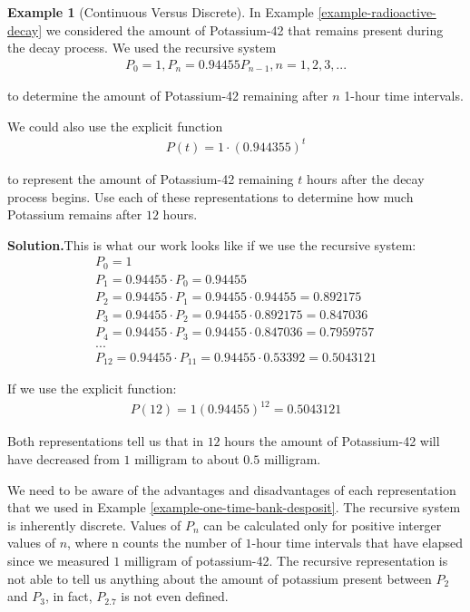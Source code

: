 \documentclass[10pt,]{book}
\theoremstyle{plain}
\theoremstyle{definition}
\theoremstyle{definition}
\newtheorem{example}[theorem]{Example}
\theoremstyle{definition}
\numberwithin{equation}{section}
\begin{document}
\begin{example}[Continuous Versus Discrete]\label{example-continuous-discrete}
In Example \hyperref[example-radioactive-decay]{\ref{example-radioactive-decay}} we considered the amount of Potassium-42 that remains present during the decay process.  We used the recursive system%
%
\begin{gather*}
P_0=1, P_n=0.94455P_{n-1}, n=1,2,3,...
\end{gather*}
\par
to determine the amount of Potassium-42 remaining after \(n\) 1-hour time intervals.%
\par
We could also use the explicit function%
%
\begin{gather*}
P(t)=1 \cdot (0.944355)^t
\end{gather*}
\par
to represent the amount of Potassium-42 remaining \(t\) hours after the decay process begins. Use each of these representations to determine how much Potassium remains after \(12\) hours.%
\par\medskip\noindent%
\textbf{Solution.}\quad This is what our work looks like if we use the recursive system:%
%
\begin{gather*}
P_0=1\\
P_1=0.94455 \cdot P_0 = 0.94455\\
P_2=0.94455 \cdot P_1 = 0.94455 \cdot 0.94455 = 0.892175\\
P_3=0.94455 \cdot P_2 = 0.94455 \cdot 0.892175 = 0.847036\\
P_4=0.94455 \cdot P_3 = 0.94455 \cdot 0.847036 = 0.7959757\\
...\\
P_{12}=0.94455 \cdot P_{11} = 0.94455 \cdot 0.53392 = 0.5043121
\end{gather*}
\par
If we use the explicit function:%
%
\begin{gather*}
P(12)=1(0.94455)^{12} = 0.5043121
\end{gather*}
\par
Both representations tell us that in \(12\) hours the amount of Potassium-42 will have decreased from \(1\) milligram to about \(0.5\) milligram.%
\par
We need to be aware of the advantages and disadvantages of each representation that we used in Example \hyperref[example-one-time-bank-desposit]{\ref{example-one-time-bank-desposit}}. The recursive system is inherently discrete.  Values of \(P_n\) can be calculated only for positive interger values of \(n\), where n counts the number of \(1\)-hour time intervals that have elapsed since we measured \(1\) milligram of potassium-42. The recursive representation is not able to tell us anything about the amount of potassium present between \(P_2\) and \(P_3\), in fact, \(P_{2.7}\) is not even defined.%

\end{example}
\end{document}
